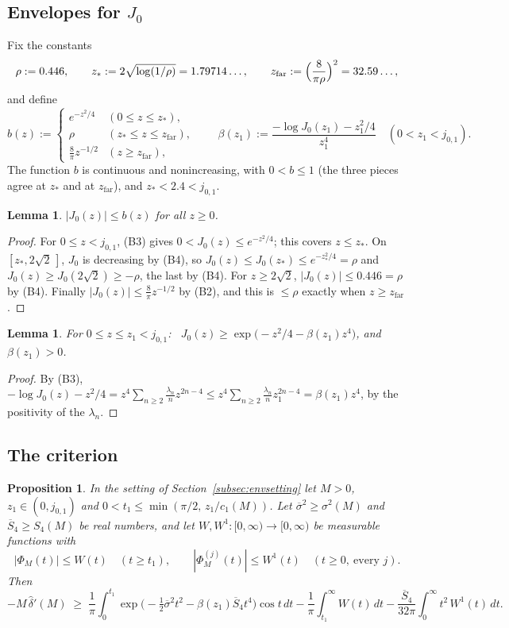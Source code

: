 \documentclass[11pt]{amsart}
\newtheorem{proposition}[theorem]{Proposition}
\newtheorem{lemma}[theorem]{Lemma}
\theoremstyle{definition}
\numberwithin{equation}{section}
\newcommand{\hd}{\widehat\delta}
\begin{document}
\subsection{Envelopes for \texorpdfstring{$J_0$}{J0}}
Fix the constants
\[
\rho:=0.446,\qquad z_*:=2\sqrt{\log(1/\rho)}=1.79714\ldots,\qquad
z_{\mathrm{far}}:=\Bigl(\frac{8}{\pi\rho}\Bigr)^2=32.59\ldots,
\]
and define
\[
b(z):=\begin{cases}e^{-z^2/4}&(0\le z\le z_*),\\
\rho&(z_*\le z\le z_{\mathrm{far}}),\\
\frac8\pi z^{-1/2}&(z\ge z_{\mathrm{far}}),\end{cases}
\qquad
\beta(z_1):=\frac{-\log J_0(z_1)-z_1^2/4}{z_1^4}\quad(0<z_1<j_{0,1}).
\]
The function $b$ is continuous and nonincreasing, with $0<b\le1$
(the three pieces agree at $z_*$ and at $z_{\mathrm{far}}$), and
$z_*<2.4<j_{0,1}$.

\begin{lemma}\label{lem:J}
$|J_0(z)|\le b(z)$ for all $z\ge0$.
\end{lemma}

\begin{proof}
For $0\le z<j_{0,1}$, (B3) gives $0<J_0(z)\le e^{-z^2/4}$; this
covers $z\le z_*$. On $[z_*,2\sqrt2\,]$, $J_0$ is decreasing by (B4),
so $J_0(z)\le J_0(z_*)\le e^{-z_*^2/4}=\rho$ and
$J_0(z)\ge J_0(2\sqrt2)\ge-\rho$, the last by (B4). For $z\ge2\sqrt2$,
$|J_0(z)|\le0.446=\rho$ by (B4). Finally $|J_0(z)|\le\frac8\pi z^{-1/2}$
by (B2), and this is $\le\rho$ exactly when $z\ge z_{\mathrm{far}}$.
\end{proof}

\begin{lemma}\label{lem:L}
For $0\le z\le z_1<j_{0,1}$: \
$J_0(z)\ge\exp\bigl(-z^2/4-\beta(z_1)z^4\bigr)$, and $\beta(z_1)>0$.
\end{lemma}

\begin{proof}
By (B3), $-\log J_0(z)-z^2/4=z^4\sum_{n\ge2}\frac{\lambda_n}{n}z^{2n-4}
\le z^4\sum_{n\ge2}\frac{\lambda_n}{n}z_1^{2n-4}=\beta(z_1)z^4$, by the
positivity of the $\lambda_n$.
\end{proof}

\subsection{The criterion}

\begin{proposition}\label{prop:C0}
In the setting of Section~\ref{subsec:envsetting} let $M>0$,
$z_1\in(0,j_{0,1})$ and $0<t_1\le\min(\pi/2,\,z_1/c_1(M))$. Let
$\overline{\sigma}^2\ge\sigma^2(M)$ and $\overline S_4\ge S_4(M)$ be
real numbers, and let $W,W^1:[0,\infty)\to[0,\infty)$ be measurable
functions with
\[
|\Phi_M(t)|\le W(t)\quad(t\ge t_1),\qquad
|\Phi_M^{(j)}(t)|\le W^1(t)\quad(t\ge0,\ \text{every }j).
\]
Then
\[
-M\,\hd'(M)\;\ge\;\frac1\pi\int_0^{t_1}
\exp\bigl(-\tfrac12\overline{\sigma}^2t^2-\beta(z_1)\overline S_4t^4\bigr)\cos t\,dt
-\frac1\pi\int_{t_1}^\infty W(t)\,dt
-\frac{\overline S_4}{32\pi}\int_0^\infty t^2\,W^1(t)\,dt .
\]
\end{proposition}
\end{document}
